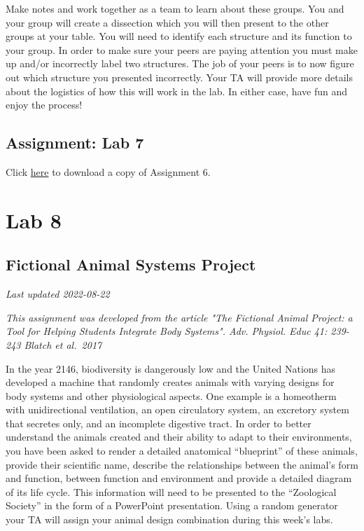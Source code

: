 \documentclass[
]{book}
\begin{document}
Make notes and work together as a team to learn about these groups. You and your group will create a dissection which you will then present to the other groups at your table. You will need to identify each structure and its function to your group. In order to make sure your peers are paying attention you must make up and/or incorrectly label two structures. The job of your peers is to now figure out which structure you presented incorrectly. Your TA will provide more details about the logistics of how this will work in the lab. In either case, have fun and enjoy the process!

\hypertarget{assignment-lab-7}{%
\chapter*{Assignment: Lab 7}\label{assignment-lab-7}}

Click \href{files/Lab6_Assignment.pdf}{here} to download a copy of Assignment 6.

\hypertarget{part-lab-8}{%
\part*{Lab 8}\label{part-lab-8}}

\hypertarget{fictional-animal-systems-project}{%
\chapter*{Fictional Animal Systems Project}\label{fictional-animal-systems-project}}

\emph{Last updated 2022-08-22}

\emph{This assignment was developed from the article "The Fictional Animal Project: a Tool for Helping Students Integrate Body Systems". Adv. Physiol. Educ 41: 239-243 Blatch et al.~2017}

In the year 2146, biodiversity is dangerously low and the United Nations has developed a machine that randomly creates animals with varying designs for body systems and other physiological aspects. One example is a homeotherm with unidirectional ventilation, an open circulatory system, an excretory system that secretes only, and an incomplete digestive tract. In order to better understand the animals created and their ability to adapt to their environments, you have been asked to render a detailed anatomical ``blueprint'' of these animals, provide their scientific name, describe the relationships between the animal's form and function, between function and environment and provide a detailed diagram of its life cycle. This information will need to be presented to the ``Zoological Society'' in the form of a PowerPoint presentation. Using a random generator your TA will assign your animal design combination during this week's labs.
\end{document}
